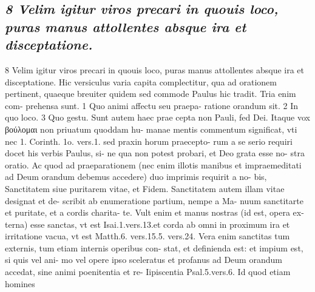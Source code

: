 \documentclass{article}
\begin{document}
\begin{pages}
\subsection*{\textit{8 Velim igitur viros precari in quouis loco, puras manus attollentes absque ira et disceptatione.}}8 Velim igitur viros precari in quouis loco, puras manus attollentes absque ira et disceptatione. Hic versiculus varia capita complectitur, qua ad orationem pertinent, quaeque breuiter quidem sed commode Paulus hic tradit. Tria enim com- prehensa sunt. 1 Quo animi affectu seu praepa- ratione orandum sit. 2 In quo loco. 3 Quo gestu. Sunt autem haec prae cepta non Pauli, fed Dei. Itaque vox βούλομαι non priuatum quoddam hu- manae mentis commentum significat, vti nec 1. Corinth. 1o. vers.1. sed praxin horum praecepto- rum a se serio requiri docet his verbis Paulus, si- ne qua non potest probari, et Deo grata esse no- stra oratio. Ac quod ad praeparationem (nec enim illotis manibus et impraemeditati ad Deum orandum debemus accedere) duo imprimis requirit a no- bis, Sanctitatem siue puritarem vitae, et Fidem. Sanctitatem autem illam vitae designat et de- scribit ab enumeratione partium, nempe a Ma- nuum sanctitarte et puritate, et a cordis charita- te. Vult enim et manus nostras (id est, opera ex- terna) esse sanctas, vt est Isai.1.vers.13.et corda ab omni in proximum ira et irritatione vacua, vt est Matth.6. vers.15.5. vers.24. Vera enim sanctitas tum externis, tum etiam internis operibus con- stat, et definienda est: et impium est, si quis vel ani- mo vel opere ipso sceleratus et profanus ad Deum orandum accedat, sine animi poenitentia et re- Iipiscentia Psal.5.vers.6. Id quod etiam homines  \pend

\end{pages}
\end{document}
